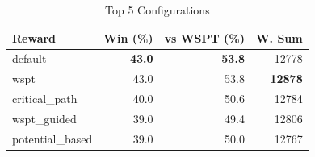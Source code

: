 \begin{table}[htbp]%
\centering%
\begin{tabular}{lrrr}%
\toprule%
\textbf{Reward}&\textbf{Win (\%)}&\textbf{vs WSPT (\%)}&\textbf{W. Sum}\\%
\midrule%
default&\textbf{43.0}&\textbf{53.8}&12778\\%
wspt&43.0&53.8&\textbf{12878}\\%
critical_path&40.0&50.6&12784\\%
wspt_guided&39.0&49.4&12806\\%
potential_based&39.0&50.0&12767\\%
\bottomrule%
\end{tabular}%
\caption{Top 5 Configurations}%
\label{tab:summary}%
\end{table}